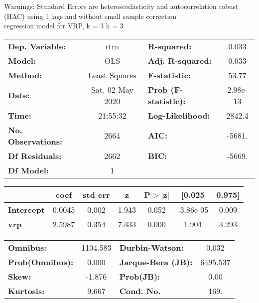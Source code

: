 Warnings: \newline
 [1] Standard Errors are heteroscedasticity and autocorrelation robust (HAC) using 1 lags and without small sample correction\\ 

regression model for VRP, k = 3 h = 3\begin{center}
\begin{tabular}{lclc}
\toprule
\textbf{Dep. Variable:}    &       rtrn       & \textbf{  R-squared:         } &     0.033   \\
\textbf{Model:}            &       OLS        & \textbf{  Adj. R-squared:    } &     0.033   \\
\textbf{Method:}           &  Least Squares   & \textbf{  F-statistic:       } &     53.77   \\
\textbf{Date:}             & Sat, 02 May 2020 & \textbf{  Prob (F-statistic):} &  2.98e-13   \\
\textbf{Time:}             &     21:55:32     & \textbf{  Log-Likelihood:    } &    2842.4   \\
\textbf{No. Observations:} &        2664      & \textbf{  AIC:               } &    -5681.   \\
\textbf{Df Residuals:}     &        2662      & \textbf{  BIC:               } &    -5669.   \\
\textbf{Df Model:}         &           1      & \textbf{                     } &             \\
\bottomrule
\end{tabular}
\begin{tabular}{lcccccc}
                   & \textbf{coef} & \textbf{std err} & \textbf{z} & \textbf{P$> |$z$|$} & \textbf{[0.025} & \textbf{0.975]}  \\
\midrule
\textbf{Intercept} &       0.0045  &        0.002     &     1.943  &         0.052        &    -3.86e-05    &        0.009     \\
\textbf{vrp}       &       2.5987  &        0.354     &     7.333  &         0.000        &        1.904    &        3.293     \\
\bottomrule
\end{tabular}
\begin{tabular}{lclc}
\textbf{Omnibus:}       & 1104.583 & \textbf{  Durbin-Watson:     } &    0.032  \\
\textbf{Prob(Omnibus):} &   0.000  & \textbf{  Jarque-Bera (JB):  } & 6495.537  \\
\textbf{Skew:}          &  -1.876  & \textbf{  Prob(JB):          } &     0.00  \\
\textbf{Kurtosis:}      &   9.667  & \textbf{  Cond. No.          } &     169.  \\
\bottomrule
\end{tabular}
\end{center}

